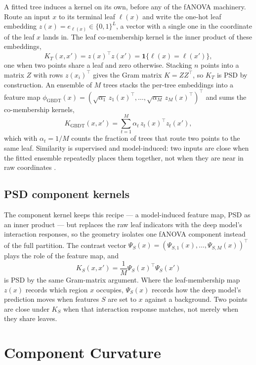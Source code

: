 \documentclass[11pt]{article}
\begin{document}
A fitted tree induces a kernel on its own, before any of the fANOVA machinery.
Route an input $x$ to its terminal leaf $\ell(x)$ and write the one-hot leaf
embedding $z(x)=e_{\ell(x)}\in\{0,1\}^L$, a vector with a single one in the
coordinate of the leaf $x$ lands in. The leaf co-membership kernel is the inner
product of these embeddings,
\begin{equation}
 K_T(x,x')=z(x)^\top z(x')=\mathbf 1\{\ell(x)=\ell(x')\},
\end{equation}
one when two points share a leaf and zero otherwise. Stacking $n$ points into a
matrix $Z$ with rows $z(x_i)^\top$ gives the Gram matrix $K=ZZ^\top$, so $K_T$ is
PSD by construction. An ensemble of $M$ trees stacks the per-tree embeddings into
a feature map
$\phi_{\mathrm{GBDT}}(x)=(\sqrt{\alpha_1}\,z_1(x)^\top,\ldots,\sqrt{\alpha_M}\,z_M(x)^\top)^\top$
and sums the co-membership kernels,
\begin{equation}
 K_{\mathrm{GBDT}}(x,x')=\sum_{t=1}^M \alpha_t\,z_t(x)^\top z_t(x'),
\end{equation}
which with $\alpha_t=1/M$ counts the fraction of trees that route two points to
the same leaf. Similarity is supervised and model-induced: two inputs are close
when the fitted ensemble repeatedly places them together, not when they are near
in raw coordinates \cite{SudjiantoZhang2026}.

\subsection{PSD component kernels}

The component kernel keeps this recipe --- a model-induced feature map, PSD as an
inner product --- but replaces the raw leaf indicators with the deep model's
interaction responses, so the geometry isolates one fANOVA component instead of
the full partition. The contrast vector
$\Psi_S(x)=(\Psi_{S,1}(x),\ldots,\Psi_{S,M}(x))^\top$ plays the role of the
feature map, and
\begin{equation}
 K_S(x,x')=\frac{1}{M}\Psi_S(x)^\top\Psi_S(x')
\label{eq:kernel}
\end{equation}
is PSD by the same Gram-matrix argument. Where the leaf-membership map $z(x)$
records which region $x$ occupies, $\Psi_S(x)$ records how the deep model's
prediction moves when features $S$ are set to $x$ against a background. Two points
are close under $K_S$ when that interaction response matches, not merely when they
share leaves.

\section{Component Curvature}
\label{sec:curvature}
\end{document}
